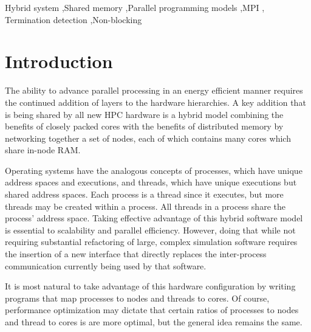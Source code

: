 \documentclass[final,1p,times]{elsarticle}
\begin{document}
\begin{frontmatter}
\begin{abstract}
\end{abstract}

\begin{keyword}
Hybrid system \sep Shared memory \sep Parallel programming models \sep MPI \sep
Termination detection \sep Non-blocking


\end{keyword}

\end{frontmatter}


\section{Introduction}
\label{sec:intro}

The ability to advance parallel processing in an energy efficient
manner requires the continued addition of layers to the hardware
hierarchies.
A key addition that is being shared by all new
HPC hardware is a hybrid model combining the benefits
of closely packed cores with the benefits of distributed memory
by networking together a set of nodes, each of which contains
many cores which share in-node RAM.

Operating systems have the analogous concepts of processes,
which have unique address spaces and executions, and threads, which
have unique executions but shared address spaces.
Each process is a thread since it executes, but more
threads may be created within a process.
All threads in a process share the process' address space.
Taking effective advantage of this hybrid software model is essential
to scalability and parallel efficiency.
However, doing that while not requiring substantial refactoring
of large, complex simulation software requires the insertion
of a new interface that directly replaces the inter-process communication
currently being used by that software.

It is most natural to take advantage of this hardware
configuration by writing programs that map processes to nodes
and threads to cores.
Of course, performance optimization may dictate that certain
ratios of processes to nodes and thread to cores is are more optimal,
but the general idea remains the same.
\end{document}
